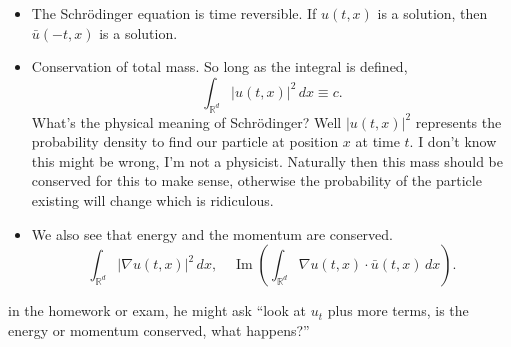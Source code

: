 \begin{proposition}
	\begin{itemize}
	
		\item The Schr\"odinger equation is time reversible. If \( u(t, x) \) is a solution, then \( \bar u(-t, x) \) is a solution.
		\item Conservation of total mass. So long as the integral is defined,
			\[ \int_{\mathbb{R}^{d}} |u(t, x)|^{2} \, dx \equiv c. \]
			What's the physical meaning of Schr\"odinger? Well \( |u(t, x)|^{2} \) represents the probability density to find our particle at position \( x \) at time \( t \). I don't know this might be wrong, I'm not a physicist. Naturally then this mass should be conserved for this to make sense, otherwise the probability of the particle existing will change which is ridiculous.
		\item We also see that energy and the momentum are conserved.
			\[ \int_{\mathbb{R}^{d}}  | \nabla u (t, x)|^{2} \, dx, \quad \operatorname{Im} \left( \int_{\mathbb{R}^{d}} \nabla u(t, x) \cdot \bar u(t, x) \, dx \right). \]
	\end{itemize}
\end{proposition}
in the homework or exam, he might ask ``look at \( u_{t} \) plus more terms, is the energy or momentum conserved, what happens?''

